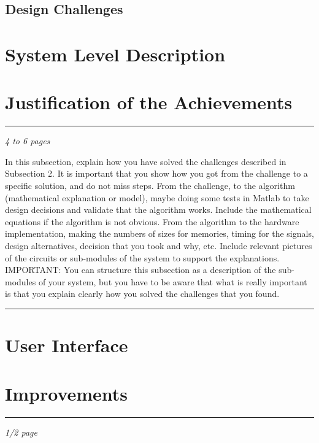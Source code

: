 \subsection{Design Challenges}\label{sec:designchallenges}


\section{System Level Description}\label{cha:syslvl}

\section{Justification of the Achievements}\label{cha:justice}
\hrule
\em 4 to 6 pages

In this subsection, explain how you have solved the challenges described in Subsection 2. It is important that you show how you got from the challenge to a specific solution, and do not miss steps. From the challenge, to the algorithm (mathematical explanation or model), maybe doing some tests in Matlab to take design decisions and validate that the algorithm works. Include the mathematical equations if the algorithm is not obvious. From the algorithm to the hardware implementation, making the numbers of sizes for memories, timing for the signals, design alternatives, decision that you took and why, etc. Include relevant pictures of the circuits or sub-modules of the system to support the explanations. IMPORTANT: You can structure this subsection as a description of the sub-modules of your system, but you have to be aware that what is really important is that you explain clearly how you solved the challenges that you found. \em
\hrule


\section{User Interface}\label{cha:ui}


\section{Improvements}\label{cha:improvements}
\hrule
\em 1/2 page

